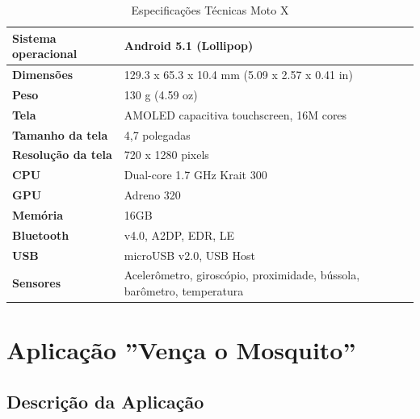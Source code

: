 \begin{table}[H]	
	\caption{Especificações Técnicas Moto X} 
	\label{t.motox} 
	\centering
	\begin{tabular}{l|l}
		\textbf{\small Sistema operacional} & {\small Android 5.1 (Lollipop)} \\\hline
		
		\textbf{\small Dimensões} & {\small 129.3 x 65.3 x 10.4 mm (5.09 x 2.57 x 0.41 in)}  \\\hline	
		
		\textbf{\small Peso} & {\small 130 g (4.59 oz)}  \\\hline		 
		
		\textbf{\small Tela} & {\small AMOLED capacitiva touchscreen, 16M cores}  \\\hline  
		
		\textbf{\small Tamanho da tela} & {\small 4,7 polegadas} \\\hline
			
		\textbf{\small Resolução da tela} & {\small 720 x 1280 pixels} \\\hline
		
		\textbf{\small CPU} & {\small Dual-core 1.7 GHz Krait 300} \\\hline
		
		\textbf{\small GPU} & {\small Adreno 320} \\\hline
		
		\textbf{\small Memória} & {\small 16GB} \\\hline
		
		\textbf{\small Bluetooth} & {\small v4.0, A2DP, EDR, LE} \\\hline
		
		\textbf{\small USB} & {\small microUSB v2.0, USB Host} \\\hline	
		
		\textbf{\small Sensores} & {\small Acelerômetro, giroscópio, proximidade, bússola, barômetro, temperatura} \\\hline	
	\end{tabular}
\end{table}

\section{Aplicação ''Vença o Mosquito''}
\label{s.aplicacao}

\subsection{Descrição da Aplicação}
\label{ss.descricao}

